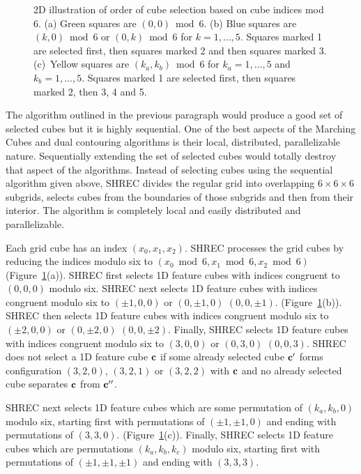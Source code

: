 \begin{figure}[t]
\caption{2D illustration of order of cube selection based 
on cube indices mod 6.
(a) Green squares are $(0,0) \bmod 6$.
(b) Blue squares are $(k,0) \bmod 6$ or $(0,k) \bmod 6$ for $k=1,\ldots,5$.
Squares marked 1 are selected first, then squares marked 2
and then squares marked 3.
(c)~Yellow squares are $(k_a,k_b) \bmod 6$ for $k_a=1,\ldots,5$
and $k_b=1,\ldots,5$.
Squares marked 1 are selected first, then squares marked 2,
then 3, 4 and 5.
}
\label{fig:mod6}
\end{figure}

The algorithm outlined in the previous paragraph would produce
a good set of selected cubes but it is highly sequential.
One of the best aspects of the Marching Cubes and dual contouring algorithms
is their local, distributed, parallelizable nature.
Sequentially extending the set of selected cubes would totally destroy
that aspect of the algorithms.
Instead of selecting cubes using the sequential algorithm given above,
SHREC divides the regular grid 
into overlapping $6 \times 6 \times 6$ subgrids,
selects cubes from the boundaries of those subgrids 
and then from their interior.
The algorithm is completely local and easily distributed and parallelizable.

Each grid cube has an index $(x_0, x_1, x_2)$.
SHREC processes the grid cubes by reducing the indices modulo six
to $(x_0 \bmod 6, x_1 \bmod 6, x_2 \bmod 6)$ (Figure~\ref{fig:mod6}(a)).
SHREC first selects 1D feature cubes 
with indices congruent to $(0,0,0)$ modulo six.
SHREC next selects 1D feature cubes with indices congruent modulo six
to $(\pm 1,0,0)$ or $(0, \pm 1, 0)$ $(0, 0, \pm 1)$.
(Figure~\ref{fig:mod6}(b)).
SHREC then selects 1D feature cubes with indices congruent modulo six
to $(\pm 2,0,0)$ or $(0, \pm 2, 0)$ $(0, 0, \pm 2)$.
Finally, SHREC selects 1D feature cubes with indices congruent modulo six
to $(3,0,0)$ or $(0, 3, 0)$ $(0, 0, 3)$.
SHREC does not select a 1D feature cube $\mathbf{c}$ 
if some already selected cube $\mathbf{c}'$
forms configuration $(3,2,0)$, $(3,2,1)$ or $(3,2,2)$ with $\mathbf{c}$
and no already selected cube separates $\mathbf{c}$ from $\mathbf{c}''$.

SHREC next selects 1D feature cubes which are some permutation
of $(k_a,k_b,0)$ modulo six,
starting first with permutations of $(\pm 1, \pm 1, 0)$
and ending with permutations of $(3, 3, 0)$.
(Figure~\ref{fig:mod6}(c)).
Finally, SHREC selects 1D feature cubes which are permutations
$(k_a, k_b, k_c)$ modulo six,
starting first with permutations of $(\pm 1, \pm 1, \pm 1)$
and ending with $(3, 3, 3)$.

